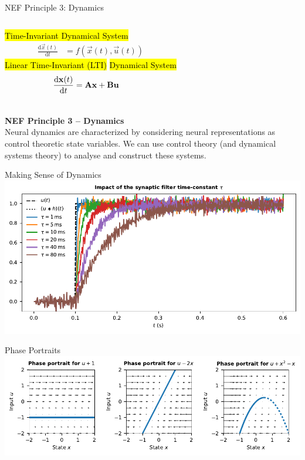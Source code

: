 \documentclass[handout,aspectratio=169]{beamer}
\begin{document}
	\begin{frame}{NEF Principle 3: Dynamics}
		\begin{columns}[b]
				\centering
				\hl{Time-Invariant Dynamical System}\\
				\begin{align*}
					\frac{\mathrm{d}\vec x(t)}{\mathrm{d}t} &= f(\vec x(t), \vec u(t))
				\end{align*}
				\centering
				\hl{Linear Time-Invariant (LTI)}
				\hl{Dynamical System}
				\begin{align*}
					\frac{\mathrm{d}{\mathbf{x}}(t)}{\mathrm{d}t} &= {\mathbf{A}} {\mathbf{x}} + {\mathbf{B}} {\mathbf{u}}
				\end{align*}
		\end{columns}
		\vspace{0.75cm}
		\begin{mdframed}
			\textbf{NEF Principle 3 -- Dynamics}\\
			Neural dynamics are characterized by considering neural representations as control theoretic state variables. We can use control theory (and dynamical systems theory) to analyse and construct these systems.
		\end{mdframed}
	\end{frame}

	\begin{frame}{Making Sense of Dynamics}
		\centering
		\includegraphics[width=\textwidth]{media/synaptic_filter.pdf} 		
	\end{frame}

	\begin{frame}{Phase Portraits}
		\centering
		\includegraphics[width=\textwidth]{media/phase_portraits.pdf}
	\end{frame}
\end{document}
